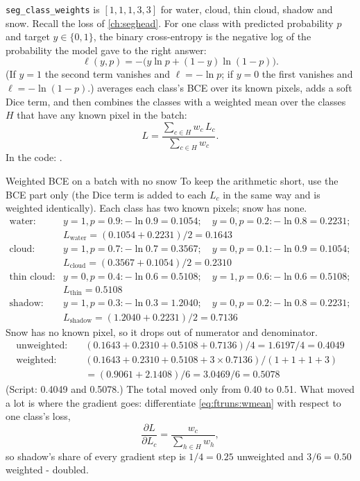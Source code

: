 \texttt{seg\_class\_weights} is $[1, 1, 1, 3, 3]$ for water, cloud, thin cloud, shadow and snow. Recall the loss of
\cref{ch:seghead}. For one class with predicted probability $p$ and target $y \in \{0, 1\}$, the binary cross-entropy is
the negative log of the probability the model gave to the right answer:
\begin{equation}
\ell(y, p) = -\big(y \ln p + (1 - y)\ln(1 - p)\big). \label{eq:ftruns:bce}
\end{equation}
(If $y = 1$ the second term vanishes and $\ell = -\ln p$; if $y = 0$ the first vanishes and $\ell = -\ln(1-p)$.)
 averages each class's BCE over its known pixels, adds a soft Dice term, and then combines the
classes with a weighted mean over the classes $H$ that have any known pixel in the batch:
\begin{equation}
L = \frac{\sum_{c \in H} w_c\,L_c}{\sum_{c \in H} w_c} . \label{eq:ftruns:wmean}
\end{equation}
In the code: .

\begin{worked}[label={we:ftruns:wbce}]{Weighted BCE on a batch with no snow}
To keep the arithmetic short, use the BCE part only (the Dice term is added to each $L_c$ in the same way and is
weighted identically). Each class has two known pixels; snow has none.
\begin{align*}
\text{water:}\quad & y = 1, p = 0.9: -\ln 0.9 = 0.1054; \quad y = 0, p = 0.2: -\ln 0.8 = 0.2231;\\
 & L_\text{water} = (0.1054 + 0.2231)/2 = 0.1643\\
\text{cloud:}\quad & y = 1, p = 0.7: -\ln 0.7 = 0.3567; \quad y = 0, p = 0.1: -\ln 0.9 = 0.1054;\\
 & L_\text{cloud} = (0.3567 + 0.1054)/2 = 0.2310\\
\text{thin cloud:}\quad & y = 0, p = 0.4: -\ln 0.6 = 0.5108; \quad y = 1, p = 0.6: -\ln 0.6 = 0.5108;\\
 & L_\text{thin} = 0.5108\\
\text{shadow:}\quad & y = 1, p = 0.3: -\ln 0.3 = 1.2040; \quad y = 0, p = 0.2: -\ln 0.8 = 0.2231;\\
 & L_\text{shadow} = (1.2040 + 0.2231)/2 = 0.7136
\end{align*}
Snow has no known pixel, so it drops out of numerator and denominator.
\begin{align*}
\text{unweighted:}\quad & (0.1643 + 0.2310 + 0.5108 + 0.7136) / 4 = 1.6197 / 4 = 0.4049\\
\text{weighted:}\quad & (0.1643 + 0.2310 + 0.5108 + 3 \times 0.7136) / (1 + 1 + 1 + 3)\\
 &= (0.9061 + 2.1408) / 6 = 3.0469 / 6 = 0.5078
\end{align*}
(Script: 0.4049 and 0.5078\tagC.) The total moved only from 0.40 to 0.51. What moved a lot is where the gradient goes:
differentiate \eqref{eq:ftruns:wmean} with respect to one class's loss,
\[
\frac{\partial L}{\partial L_c} = \frac{w_c}{\sum_{h \in H} w_h},
\]
so shadow's share of every gradient step is $1/4 = 0.25$ unweighted and $3/6 = 0.50$ weighted - doubled.
\end{worked}

